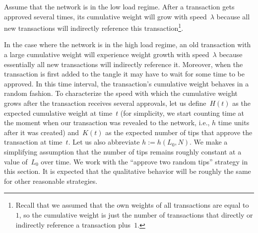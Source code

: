 \documentclass[12pt]{article}
\begin{document}
\begin{CJK}{UTF8}{bkai}
Assume that the network is in the low load regime. 
After a transaction gets approved several times, 
its cumulative weight will grow 
with speed~$\lambda$ 
because all new transactions
will indirectly reference this 
transaction\footnote{Recall that we assumed that
the own weights of all transactions are equal to~$1$,
so the cumulative weight is just the number of transactions
that directly or indirectly reference a transaction
plus~$1$.}.

In the case where the network is in the high load regime, an 
old transaction with a large cumulative weight will experience 
weight growth 
with speed~$\lambda$ 
because essentially 
all new transactions will indirectly reference it.
Moreover, when the transaction is first added to the tangle it may have 
to wait for some time to be approved. In this time interval, the 
transaction's cumulative weight behaves in a random fashion.
To characterize the speed with which the cumulative weight 
grows after the 
transaction receives several approvals, let us define~$H(t)$
 as the expected cumulative weight at time~$t$ 
(for simplicity, 
we start counting time at the moment when
 our transaction was revealed to the network, i.e.,
$h$ time units after it was created)
 and~$K(t)$ as the expected number of
 tips that approve the transaction at time~$t$.
Let us also abbreviate $h:=h(L_0,N)$. 
We make a simplifying
assumption that the number of tips remains roughly
constant at a value of~$L_0$ over time. 
We work with the ``approve two random tips'' strategy in this section. 
It is expected that the qualitative behavior will be roughly the same for 
other reasonable strategies. 


\end{CJK}
\end{document}
